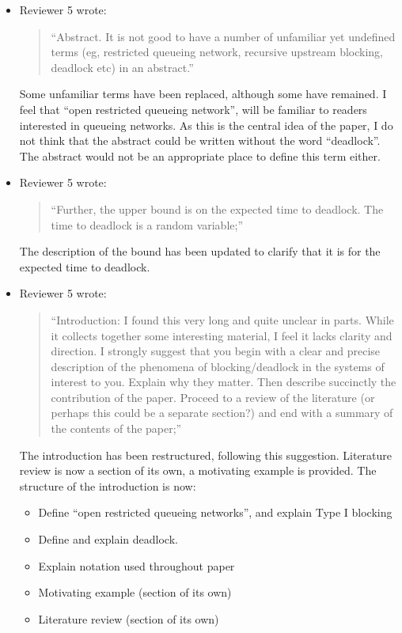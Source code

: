 \documentclass{article}
\begin{document}
\begin{itemize}
\item Reviewer 5 wrote:
\begin{quote}
``Abstract. It is not good to have a number of unfamiliar yet undefined terms
(eg, restricted queueing network, recursive upstream blocking, deadlock etc)
in an abstract.''
\end{quote}
Some unfamiliar terms have been replaced, although some have remained.
I feel that ``open restricted queueing network'', will be
familiar to readers interested in queueing networks.
As this is the central idea of the paper, I do not think that the abstract
could be written without the word ``deadlock''.
The abstract would not be an appropriate place to define this term either.

\item Reviewer 5 wrote:
\begin{quote}
``Further, the upper bound is on the expected time to deadlock.
The time to deadlock is a random variable;''
\end{quote}
The description of the bound has been updated to clarify that it is for the
expected time to deadlock.

\item Reviewer 5 wrote:
\begin{quote}
``Introduction: I found this very long and quite unclear in parts.
While it collects together some interesting material, I feel it lacks clarity
and direction.
I strongly suggest that you begin with a clear and precise description of the
phenomena of blocking/deadlock in the systems of interest to you.
Explain why they matter.
Then describe succinctly the contribution of the paper.
Proceed to a review of the literature (or perhaps this could be a separate
section?) and end with a summary of the contents of the paper;''
\end{quote}
The introduction has been restructured, following this suggestion.
Literature review is now a section of its own, a motivating example is
provided.
The structure of the introduction is now:
\begin{itemize}
\item Define ``open restricted queueing networks'', and explain Type I blocking
\item Define and explain deadlock.
\item Explain notation used throughout paper
\item Motivating example (section of its own)
\item Literature review (section of its own)
\end{itemize}


\end{itemize}
\end{document}
